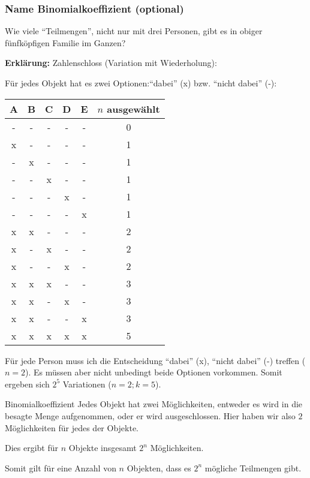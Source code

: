 \subsubsection{Name Binomialkoeffizient (optional)}

 Wie viele ``Teilmengen'', nicht nur mit drei Personen, gibt es in obiger
  fünfköpfigen Familie im Ganzen?

    

\textbf{Erklärung:} Zahlenschloss (Variation mit Wiederholung):

Für jedes Objekt hat es zwei Optionen:``dabei'' (x) bzw. ``nicht dabei'' (-):

\begin{tabular}{ccccc|c}
A&B&C&D&E&$n$ ausgewählt \\\hline
-&-&-&-&-&0\\
x&-&-&-&-&1\\
-&x&-&-&-&1\\
-&-&x&-&-&1\\
-&-&-&x&-&1\\
-&-&-&-&x&1\\
x&x&-&-&-&2\\
x&-&x&-&-&2\\
x&-&-&x&-&2\\
\hline
\hline
x&x&x&-&-&3\\
x&x&-&x&-&3\\
x&x&-&-&x&3\\
\hline \hline
x&x&x&x&x&5\\\hline
\end{tabular}

Für jede Person muss ich die Entscheidung ``dabei'' (x), ``nicht dabei'' (-) treffen ($n=2$). Es müssen aber nicht unbedingt beide Optionen vorkommen. Somit ergeben sich $2^5$ Variationen ($n=2; k=5$).


\begin{bemerkung}{Binomialkoeffizient}{}
  Jedes Objekt hat zwei Möglichkeiten, entweder es wird in die besagte
  Menge aufgenommen, oder er wird ausgeschlossen. Hier haben wir also
  $2$ Möglichkeiten für jedes der Objekte.
  
  Dies ergibt für $n$ Objekte insgesamt $2^n$ Möglichkeiten.

  Somit gilt für eine Anzahl von $n$ Objekten, dass es $2^n$ mögliche
  Teilmengen gibt.
\end{bemerkung}
\newpage


